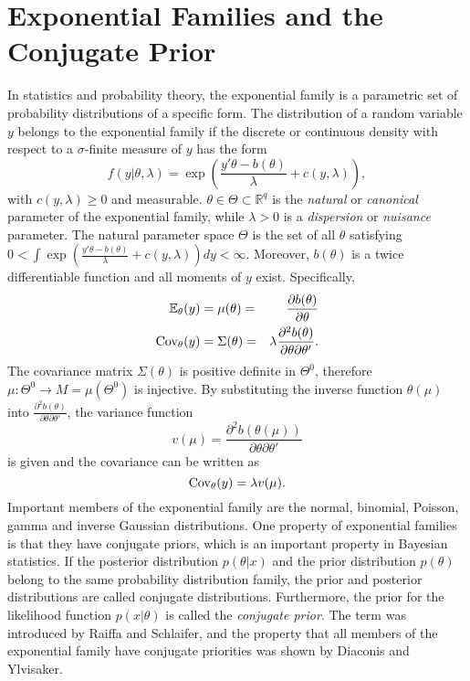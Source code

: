 \documentclass[12pt]{book}
\begin{document}
\section{Exponential Families and the Conjugate Prior}
In statistics and probability theory, the exponential family is a parametric set of probability distributions of a specific form. The distribution of a random variable $y$ belongs to the exponential family if the discrete or continuous density with respect to a $\sigma$-finite measure of $y$ has the form
\begin{equation}
    f(y|\theta, \lambda)=\exp\left(\frac{y'\theta - b(\theta)}{\lambda}+c(y,\lambda) \right),
\end{equation}
with $c(y,\lambda)\geq 0$ and measurable. $\theta\in\Theta\subset\mathbb{R}^q$ is the \textit{natural} or \textit{canonical} parameter of the exponential family, while $\lambda > 0$ is a \textit{dispersion} or \textit{nuisance} parameter. The natural parameter space $\Theta$ is the set of all $\theta$ satisfying $0<\int\exp\left(\frac{y'\theta - b(\theta)}{\lambda}+c(y,\lambda) \right)dy< \infty$. Moreover, $b(\theta)$ is a twice differentiable  function and all moments of $y$ exist. Specifically, 
\begin{alignat}{3}
    \mathbb{E}_\theta(y) &= \mu(\theta) =& \frac{\partial b(\theta)}{\partial\theta} \\
    \hbox{Cov}_\theta(y) &= \Sigma(\theta) =& \lambda\frac{\partial^2b(\theta)}{\partial\theta\partial\theta'}.
\end{alignat}
The covariance matrix $\Sigma(\theta)$ is positive definite in $\Theta^0$, therefore $\mu:\Theta^0\rightarrow  M = \mu\left(\Theta^0\right)$ is injective. By substituting the inverse function $\theta(\mu)$ into $\frac{\partial^2b(\theta)}{\partial\theta\partial\theta'}$, the variance function 
\begin{equation}
    v(\mu)=\frac{\partial^2b(\theta(\mu))}{\partial\theta\partial\theta'}
\end{equation}
is given and the covariance can be written as
\begin{equation}
    \hbox{Cov}_\theta(y) = \lambda v(\mu).
\end{equation}
Important members of the exponential family are the normal, binomial, Poisson, gamma and inverse Gaussian distributions. \autocite[Cf.][]{fahrmeir2013multivariate} One property of exponential families is that they have conjugate priors, which is an important property in Bayesian statistics. If the posterior distribution $p(\theta|x)$ and the prior distribution $p(\theta)$ belong to the same probability distribution family, the prior and posterior distributions are called conjugate distributions. Furthermore, the prior for the likelihood function $p(x|\theta)$ is called the \textit{conjugate prior}. The term was introduced by Raiffa and Schlaifer\autocite[Cf.][]{raiffaapplied}, and the property that all members of the exponential family have conjugate priorities was shown by Diaconis and Ylvisaker.\autocite[Cf.][]{diaconis1979conjugate}
\end{document}
